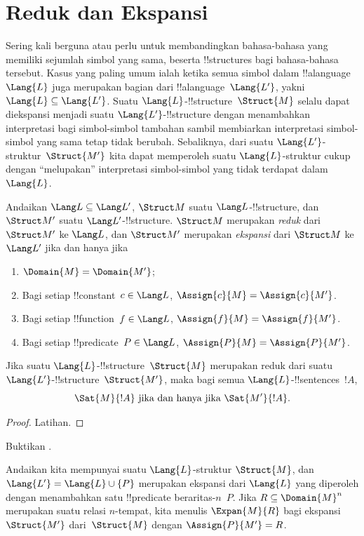 \documentclass[../../../include/open-logic-section]{subfiles}
\begin{document}
\section{Reduk dan Ekspansi}

Sering kali berguna atau perlu untuk membandingkan bahasa-bahasa yang
memiliki sejumlah simbol yang sama, beserta !!{structure}s bagi
bahasa-bahasa tersebut. Kasus yang paling umum ialah ketika semua simbol
dalam !!a{language}~$\Lang{L}$ juga merupakan bagian dari
!!a{language}~$\Lang{L'}$, yakni $\Lang{L} \subseteq \Lang{L'}$.
Suatu $\Lang{L}$-!!{structure}~$\Struct{M}$ selalu dapat diekspansi
menjadi suatu $\Lang{L'}$-!!{structure} dengan menambahkan interpretasi
bagi simbol-simbol tambahan sambil membiarkan interpretasi simbol-simbol
yang sama tetap tidak berubah. Sebaliknya, dari suatu
$\Lang{L'}$-struktur~$\Struct{M'}$ kita dapat memperoleh suatu
$\Lang{L}$-struktur cukup dengan ``melupakan'' interpretasi simbol-simbol
yang tidak terdapat dalam~$\Lang{L}$.

\begin{defn}
Andaikan $\Lang L \subseteq \Lang L'$, $\Struct M$ suatu
$\Lang L$-!!{structure}, dan $\Struct M'$ suatu
$\Lang L'$-!!{structure}. $\Struct M$ merupakan \emph{reduk} dari
$\Struct M'$ ke $\Lang L$, dan $\Struct M'$ merupakan \emph{ekspansi}
dari $\Struct M$ ke $\Lang L'$ jika dan hanya jika
\begin{enumerate}
\item $\Domain{M} = \Domain{M'}$;
\item Bagi setiap !!{constant}~$c \in \Lang L$, $\Assign{c}{M} =
  \Assign{c}{M'}$.
\item Bagi setiap !!{function}~$f \in \Lang L$, $\Assign{f}{M} =
  \Assign{f}{M'}$.
\item Bagi setiap !!{predicate}~$P \in \Lang L$, $\Assign{P}{M} =
  \Assign{P}{M'}$.
\end{enumerate}
\end{defn}

\begin{prop}
Jika suatu $\Lang{L}$-!!{structure}~$\Struct{M}$ merupakan reduk dari
suatu $\Lang{L'}$-!!{structure}~$\Struct{M'}$, maka bagi semua
$\Lang{L}$-!!{sentence}s~$!A$,
\[
\Sat{M}{!A} \text{ jika dan hanya jika } \Sat{M'}{!A}.
\]
\end{prop}

\begin{proof}
  Latihan.
\end{proof}

\begin{prob}
Buktikan .
\end{prob}

\begin{defn}
Andaikan kita mempunyai suatu $\Lang{L}$-struktur $\Struct{M}$, dan
$\Lang{L'} = \Lang{L} \cup \{P\}$ merupakan ekspansi dari $\Lang{L}$
yang diperoleh dengan menambahkan satu !!{predicate} beraritas-$n$~$P$.
Jika $R \subseteq \Domain{M}^n$ merupakan suatu relasi $n$-tempat,
kita menulis $\Expan{M}{R}$ bagi ekspansi~$\Struct{M'}$ dari~$\Struct{M}$
dengan $\Assign{P}{M'} = R$.
\end{defn}
\end{document}
